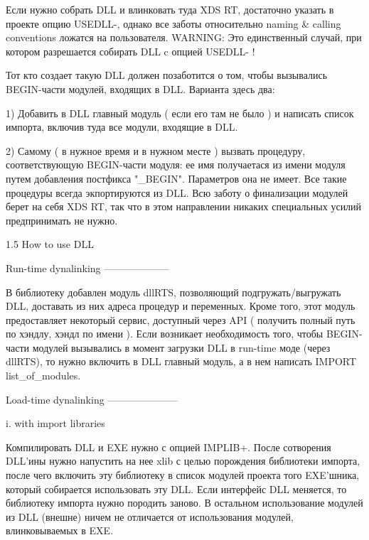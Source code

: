           Если нужно собрать DLL и влинковать туда XDS RT, достаточно указать в проекте
          опцию USEDLL-, однако все заботы относительно naming & calling conventions
          ложатся на пользователя.
          WARNING: Это единственный случай, при котором разрешается собирать DLL c
          опцией USEDLL- !

          Тот кто создает такую DLL должен позаботится о том, чтобы вызывались BEGIN-части
          модулей, входящих в DLL. Варианта здесь два:

            1) Добавить в DLL главный модуль ( если его там не было ) и написать список
               импорта, включив туда все модули, входящие в DLL.

            2) Самому ( в нужное время и в нужном месте ) вызвать процедуру, соответствующую
               BEGIN-части модуля: ее имя получаетася из имени модуля путем добавления
               постфикса "_BEGIN". Параметров она не имеет. Все такие процедуры всегда
               экпортируются из DLL. Всю заботу о финализации модулей берет на себя XDS RT,
               так что в этом направлении никаких специальных усилий предпринимать не нужно.


      1.5 How to use DLL

          Run-time dynalinking
          --------------------

             В библиотеку добавлен модуль dllRTS, позволяющий подгружать/выгружать
          DLL, доставать из них адреса процедур и переменных. Кроме того, этот модуль
          предоставляет некоторый сервис, доступный через API ( получить полный
          путь по хэндлу, хэндл по имени ).
             Если возникает необходимость того, чтобы BEGIN-части модулей вызывались
          в момент загрузки DLL в run-time моде (через dllRTS), то нужно включить в DLL
          главный модуль, а в нем написать IMPORT list_of_modules.


          Load-time dynalinking
          ---------------------

             i.  with import libraries

                 Компилировать DLL и EXE нужно с опцией IMPLIB+.
                 После сотворения DLL'ины нужно напустить на нее xlib с целью
                 порождения библиотеки импорта, после чего включить эту библиотеку
                 в список модулей проекта того EXE'шника, который собирается
                 использовать эту DLL. Если интерфейс DLL меняется, то библиотеку
                 импорта нужно породить заново. В остальном использование модулей из DLL
                 (внешне) ничем не отличается от использования модулей, влинковываемых
                 в EXE.


